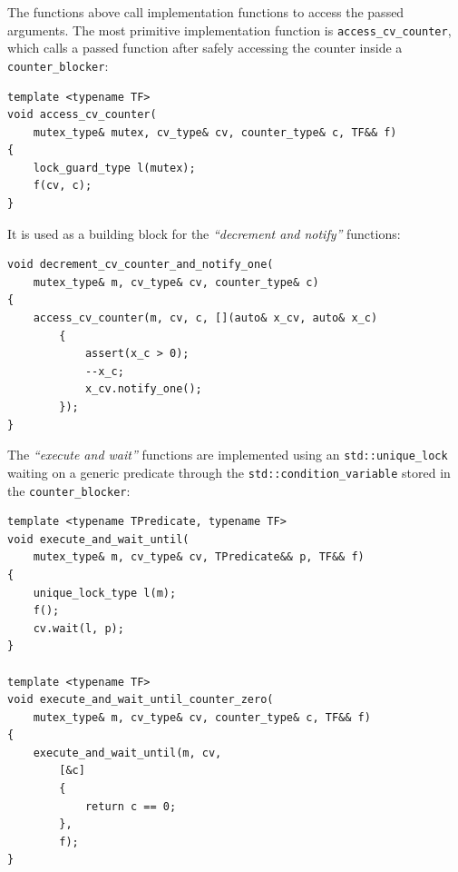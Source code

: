 \documentclass[oneside, 12pt, a4paper, openany]{book}
\begin{document}
The functions above call implementation functions to access the passed
arguments. The most primitive implementation function is
\texttt{access_cv_counter},
which calls a passed function after safely accessing the counter inside
a
\texttt{counter_blocker}:

\begin{verbatim}
template <typename TF>
void access_cv_counter(
    mutex_type& mutex, cv_type& cv, counter_type& c, TF&& f)
{
    lock_guard_type l(mutex);
    f(cv, c);
}
\end{verbatim}

It is used as a building block for the \emph{``decrement and notify''}
functions:

\begin{verbatim}
void decrement_cv_counter_and_notify_one(
    mutex_type& m, cv_type& cv, counter_type& c)
{
    access_cv_counter(m, cv, c, [](auto& x_cv, auto& x_c)
        {
            assert(x_c > 0);
            --x_c;
            x_cv.notify_one();
        });
}
\end{verbatim}

The \emph{``execute and wait''} functions are implemented using an
\texttt{std::unique_lock}
waiting on a generic predicate through the
\texttt{std::condition_variable}
stored in the
\texttt{counter_blocker}:

\begin{verbatim}
template <typename TPredicate, typename TF>
void execute_and_wait_until(
    mutex_type& m, cv_type& cv, TPredicate&& p, TF&& f)
{
    unique_lock_type l(m);
    f();
    cv.wait(l, p);
}

template <typename TF>
void execute_and_wait_until_counter_zero(
    mutex_type& m, cv_type& cv, counter_type& c, TF&& f)
{
    execute_and_wait_until(m, cv,
        [&c]
        {
            return c == 0;
        },
        f);
}
\end{verbatim}
\end{document}
